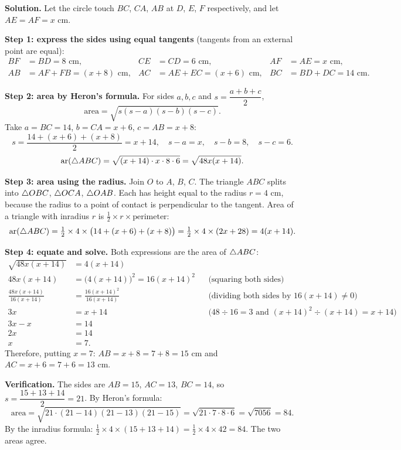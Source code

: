 \textbf{Solution.} Let the circle touch $BC$, $CA$, $AB$ at $D$, $E$, $F$ respectively, and let $AE=AF=x$ cm.

\textbf{Step 1: express the sides using equal tangents} (tangents from an external point are equal):
\begin{align*}
BF&=BD=8\text{ cm}, & CE&=CD=6\text{ cm}, & AF&=AE=x\text{ cm},\\
AB&=AF+FB=(x+8)\text{ cm}, & AC&=AE+EC=(x+6)\text{ cm}, & BC&=BD+DC=14\text{ cm}.
\end{align*}

\textbf{Step 2: area by Heron's formula.} For sides $a,b,c$ and $s=\dfrac{a+b+c}{2}$,
\[\text{area}=\sqrt{s(s-a)(s-b)(s-c)}.\]
Take $a=BC=14$, $b=CA=x+6$, $c=AB=x+8$:
\[s=\frac{14+(x+6)+(x+8)}{2}=x+14,\quad s-a=x,\quad s-b=8,\quad s-c=6.\]
\[\text{ar}(\triangle ABC)=\sqrt{(x+14)\cdot x\cdot 8\cdot 6}=\sqrt{48x(x+14)}.\]

\textbf{Step 3: area using the radius.} Join $O$ to $A$, $B$, $C$. The triangle $ABC$ splits into $\triangle OBC$, $\triangle OCA$, $\triangle OAB$. Each has height equal to the radius $r=4$ cm, because the radius to a point of contact is perpendicular to the tangent. Area of a triangle with inradius $r$ is $\tfrac12\times r\times\text{perimeter}$:
\[\text{ar}(\triangle ABC)=\tfrac12\times4\times\big(14+(x+6)+(x+8)\big)=\tfrac12\times4\times(2x+28)=4(x+14).\]

\textbf{Step 4: equate and solve.} Both expressions are the area of $\triangle ABC$:
\begin{align*}
\sqrt{48x(x+14)}&=4(x+14)\\
48x(x+14)&=\big(4(x+14)\big)^2=16(x+14)^2 &&\text{(squaring both sides)}\\
\frac{48x(x+14)}{16(x+14)}&=\frac{16(x+14)^2}{16(x+14)} &&\text{(dividing both sides by }16(x+14)\neq0\text{)}\\
3x&=x+14 &&\text{(}48\div16=3\text{ and }(x+14)^2\div(x+14)=x+14\text{)}\\
3x-x&=14\\
2x&=14\\
x&=7.
\end{align*}
Therefore, putting $x=7$: $AB=x+8=7+8=15$ cm and $AC=x+6=7+6=13$ cm.

\textbf{Verification.} The sides are $AB=15$, $AC=13$, $BC=14$, so $s=\dfrac{15+13+14}{2}=21$. By Heron's formula:
\[\text{area}=\sqrt{21\cdot(21-14)(21-13)(21-15)}=\sqrt{21\cdot7\cdot8\cdot6}=\sqrt{7056}=84.\]
By the inradius formula: $\tfrac12\times4\times(15+13+14)=\tfrac12\times4\times42=84$. The two areas agree.

